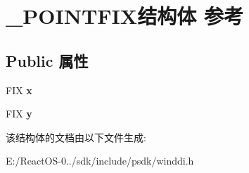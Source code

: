 \hypertarget{struct___p_o_i_n_t_f_i_x}{}\section{\+\_\+\+P\+O\+I\+N\+T\+F\+I\+X结构体 参考}
\label{struct___p_o_i_n_t_f_i_x}
\subsection*{Public 属性}
\begin{DoxyCompactItemize}
\item 
\mbox{\label{struct___p_o_i_n_t_f_i_x_aca4c73ccd8cdc65f3ee3e7f792759626}} 
F\+IX {\bfseries x}
\item 
\mbox{\label{struct___p_o_i_n_t_f_i_x_a45df301f820480ba5d19f11659aedafb}} 
F\+IX {\bfseries y}
\end{DoxyCompactItemize}


该结构体的文档由以下文件生成\+:\begin{DoxyCompactItemize}
\item 
E\+:/\+React\+O\+S-\/0../sdk/include/psdk/winddi.\+h\end{DoxyCompactItemize}
